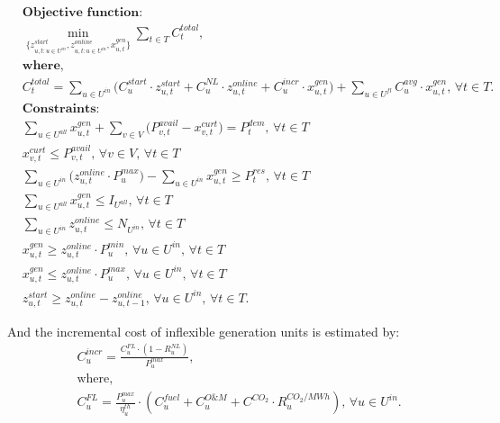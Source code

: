 \documentclass{article}
\begin{document}
{\small
\begin{align}
    & \textbf{Objective function: } \nonumber \\
    & \min_{\{ z_{u,t:u \in U^{in}}^{start},z_{u,t:u \in U^{in}}^{online},x_{u,t}^{gen} \}} \sum_{t \in T} C_t^{total} \text{, } \\
    & \textbf{where, }  \nonumber \\
    & C_t^{total} = \sum_{u \in  U^{in}} 
             \Big( C_{u}^{start} \cdot z_{u,t}^{start} + C_{u}^{NL} \cdot z_{u,t}^{online} + C_{u}^{incr} \cdot x_{u,t}^{gen} \Big) 
             + \sum_{u \in  U^{fl}} C_{u}^{avg} \cdot x_{u,t}^{gen} \text{, } \forall t \in T \text{. } \nonumber \\
    & \textbf{Constraints: } \nonumber \\
    & \sum_{u \in U^{all}} x_{u,t}^{gen} + \sum_{v \in V} \Big( P_{v,t}^{avail} - x_{v,t}^{curt} \Big) = P_t^{dem} \text{, } \forall t \in T \\
    & x_{v,t}^{curt} \leq P_{v,t}^{avail} \text{, } \forall v \in V \text{, } \forall t \in T \\
    & \sum_{u \in U^{in}} \Big( z_{u,t}^{online} \cdot P_{u}^{max} \Big) - \sum_{u \in U^{in}} x_{u,t}^{gen} \geq P_t^{res} \text{, } \forall t \in T \\
    & \sum_{u \in U^{all}} x_{u,t}^{gen} \leq I_{U^{all}} \text{, } \forall t \in T \\
    & \sum_{u \in U^{in}} z_{u,t}^{online} \leq N_{U^{in}} \text{, } \forall t \in T \\
    & x_{u,t}^{gen} \geq z_{u,t}^{online} \cdot P_{u}^{min} \text{, } \forall u \in U^{in} \text{, } \forall t \in T  \\
    & x_{u,t}^{gen} \leq z_{u,t}^{online} \cdot P_{u}^{max} \text{, } \forall u \in U^{in} \text{, } \forall t \in T  \\
    & z_{u,t}^{start} \geq z_{u,t}^{online} -z_{u,t-1}^{online} \text{, } \forall u \in U^{in} \text{, } \forall t \in T.
\end{align}
}

And the incremental cost of inflexible generation units is estimated by:
{\small
\begin{align}
    & C_{u}^{incr} = \frac{C_{u}^{FL} \cdot (1 - R_{u}^{NL})}{P_{u}^{max}} \text{, } \\
    & \text{where, } \nonumber \\
    & C_{u}^{FL} = \frac{P_{u}^{max}}{\eta_{u}^{th}} \cdot (C_{u}^{fuel} + C_{u}^{O\&M} + C^{CO_2} \cdot R_{u}^{CO_2/MWh} ) \text{, } \forall u \in U^{in}.
\end{align}
}

\newpage


\end{document}
